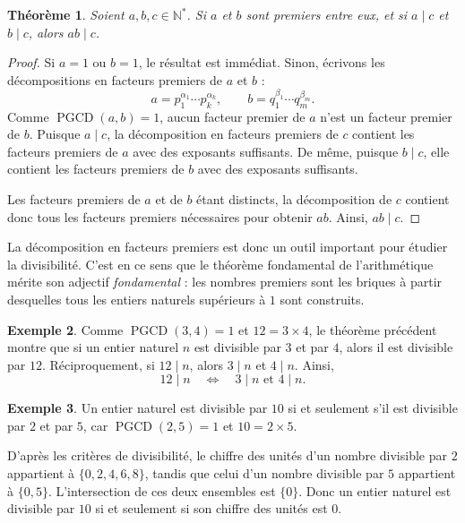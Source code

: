 \documentclass[12pt,a4paper]{article}
\theoremstyle{plain}
\newtheorem{theorem}{Théorème}[section]
\theoremstyle{definition}
\newtheorem{example}[theorem]{Exemple}
\theoremstyle{remark}
\DeclareMathOperator{\pgcd}{PGCD}
\begin{document}
\begin{tcolorbox}[navybar]
  \begin{theorem}
    Soient $a,b,c\in\mathbb{N}^*$. Si $a$ et $b$ sont premiers entre eux,
    et si $a\mid c$ et $b\mid c$, alors $ab\mid c$.
  \end{theorem}
\end{tcolorbox}

\begin{proof}
  Si $a=1$ ou $b=1$, le résultat est immédiat.
  Sinon, écrivons les décompositions en facteurs premiers de $a$ et $b$ :
  \[
    a=p_1^{\alpha_1}\cdots p_k^{\alpha_k},\qquad
    b=q_1^{\beta_1}\cdots q_m^{\beta_m}.
  \]
  Comme $\pgcd(a,b)=1$, aucun facteur premier de $a$ n'est un facteur
  premier de $b$. Puisque $a\mid c$, la décomposition en facteurs premiers
  de $c$ contient les facteurs premiers de $a$ avec des exposants suffisants.
  De même, puisque $b\mid c$, elle contient les facteurs premiers de $b$
  avec des exposants suffisants.

  Les facteurs premiers de $a$ et de $b$ étant distincts, la décomposition
  de $c$ contient donc tous les facteurs premiers nécessaires pour obtenir
  $ab$. Ainsi, $ab\mid c$.
\end{proof}

La décomposition en facteurs premiers est donc un outil important pour
étudier la divisibilité. 
C'est en ce sens que le théorème fondamental de l'arithmétique mérite son adjectif
\emph{fondamental} : les nombres premiers sont les briques à partir
desquelles tous les entiers naturels supérieurs à $1$ sont construits.

\begin{example}
  Comme $\pgcd(3,4)=1$ et $12=3\times4$, le théorème précédent montre que
  si un entier naturel $n$ est divisible par $3$ et par $4$, alors il est
  divisible par $12$. Réciproquement, si $12\mid n$, alors $3\mid n$ et
  $4\mid n$. Ainsi,
  \[
    12\mid n
    \quad\Longleftrightarrow\quad
    3\mid n\text{ et }4\mid n.
  \]
\end{example}

\begin{example}
  Un entier naturel est divisible par $10$ si et seulement s'il est divisible
  par $2$ et par $5$, car $\pgcd(2,5)=1$ et $10=2\times5$.

  D'après les critères de divisibilité, le chiffre des unités d'un nombre
  divisible par $2$ appartient à $\{0,2,4,6,8\}$, tandis que celui d'un
  nombre divisible par $5$ appartient à $\{0,5\}$. L'intersection de ces
  deux ensembles est $\{0\}$. Donc un entier naturel est divisible par $10$
  si et seulement si son chiffre des unités est $0$.
\end{example}
\end{document}
